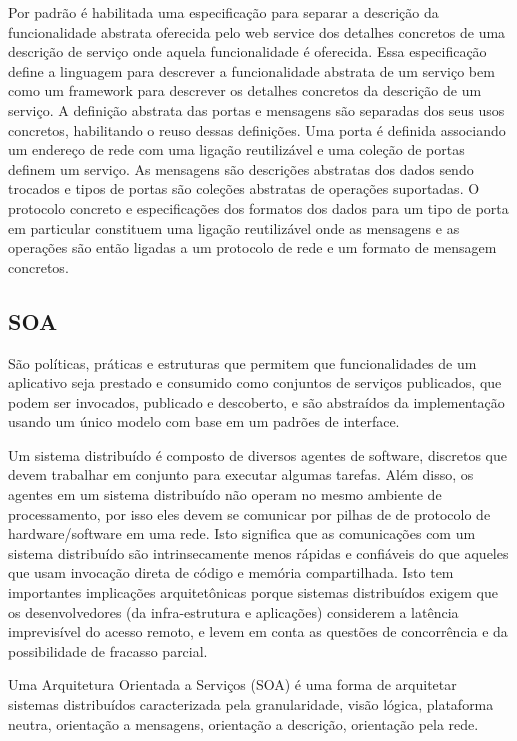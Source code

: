 \documentclass{acm_proc_article-sp}
\begin{document}
		Por padrão é habilitada uma especificação para separar a descrição da funcionalidade abstrata oferecida pelo web service dos detalhes concretos de uma descrição de serviço onde aquela funcionalidade é oferecida. Essa especificação define a linguagem para descrever a funcionalidade abstrata de um serviço bem como um framework para descrever os detalhes concretos da descrição de um serviço. A definição abstrata das portas e mensagens são separadas dos seus usos concretos, habilitando o reuso dessas definições. Uma porta é definida associando um endereço de rede com uma ligação reutilizável e uma coleção de portas definem um serviço. As mensagens são descrições abstratas dos dados sendo trocados e tipos de portas são coleções abstratas de operações suportadas. O protocolo concreto e especificações dos formatos dos dados para um tipo de porta em particular constituem uma ligação reutilizável onde as mensagens e as operações são então ligadas a um protocolo de rede e um formato de mensagem concretos. \cite{APACHE-AXIS}
		
		
	\subsection{SOA}
		
		São políticas, práticas e estruturas que permitem que funcionalidades de um aplicativo seja prestado e consumido como conjuntos de serviços publicados, que podem ser invocados, publicado e descoberto, e são abstraídos da implementação usando um único modelo com base em um padrões de interface.
		
		\cite{SOA-Microsoft}
		
		Um sistema distribuído é composto de diversos agentes de software, discretos que devem trabalhar em conjunto para executar algumas tarefas. Além disso, os agentes em um sistema distribuído não operam no mesmo ambiente de processamento, por isso eles devem se comunicar por pilhas de de protocolo de hardware/software em uma rede. Isto significa que as comunicações com um sistema distribuído são intrinsecamente menos rápidas e confiáveis do que aqueles que usam invocação direta de código e memória compartilhada. Isto tem importantes implicações arquitetônicas porque sistemas distribuídos exigem que os desenvolvedores (da infra-estrutura e aplicações) considerem a latência imprevisível do acesso remoto, e levem em conta as questões de concorrência e da possibilidade de fracasso parcial.
		
		Uma Arquitetura Orientada a Serviços (SOA) é uma forma de arquitetar sistemas distribuídos caracterizada pela granularidade, visão lógica, plataforma neutra, orientação a mensagens, orientação a descrição, orientação pela rede.
		
\end{document}
